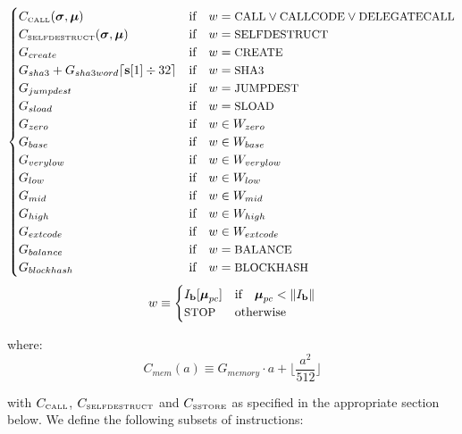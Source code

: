 \documentclass[9pt,oneside]{amsart}
\begin{document}
\begin{equation}
\begin{cases}
C_\text{\tiny CALL}(\boldsymbol{\sigma}, \boldsymbol{\mu}) & \text{if} \quad w = \text{\small CALL} \lor \text{\small CALLCODE} \lor \text{\small DELEGATECALL} \\
C_\text{\tiny SELFDESTRUCT}(\boldsymbol{\sigma}, \boldsymbol{\mu}) & \text{if} \quad w = \text{\small SELFDESTRUCT} \\
G_{create} & \text{if} \quad w = \text{\small CREATE}\\
G_{sha3}+G_{sha3word} \lceil \mathbf{s}[1] \div 32 \rceil & \text{if} \quad w = \text{\small SHA3}\\
G_{jumpdest} & \text{if} \quad w = \text{\small JUMPDEST}\\
G_{sload} & \text{if} \quad w = \text{\small SLOAD}\\
G_{zero} & \text{if} \quad w \in W_{zero}\\
G_{base} & \text{if} \quad w \in W_{base}\\
G_{verylow} & \text{if} \quad w \in W_{verylow}\\
G_{low} & \text{if} \quad w \in W_{low}\\
G_{mid} & \text{if} \quad w \in W_{mid}\\
G_{high} & \text{if} \quad w \in W_{high}\\
G_{extcode} & \text{if} \quad w \in W_{extcode}\\
G_{balance} & \text{if} \quad w = \text{\small BALANCE}\\
G_{blockhash} & \text{if} \quad w = \text{\small BLOCKHASH}\\
\end{cases}
\end{equation}
\begin{equation}
w \equiv \begin{cases} I_\mathbf{b}[\boldsymbol{\mu}_{pc}] & \text{if} \quad \boldsymbol{\mu}_{pc} < \lVert I_\mathbf{b} \rVert\\
\text{\small STOP} & \text{otherwise}
\end{cases}
\end{equation}

where:
\begin{equation}
C_{mem}(a) \equiv G_{memory} \cdot a + \Big\lfloor \dfrac{a^2}{512} \Big\rfloor
\end{equation}

with $C_\text{\tiny CALL}$, $C_\text{\tiny SELFDESTRUCT}$ and $C_\text{\tiny SSTORE}$ as specified in the appropriate section below. We define the following subsets of instructions:
\end{document}

